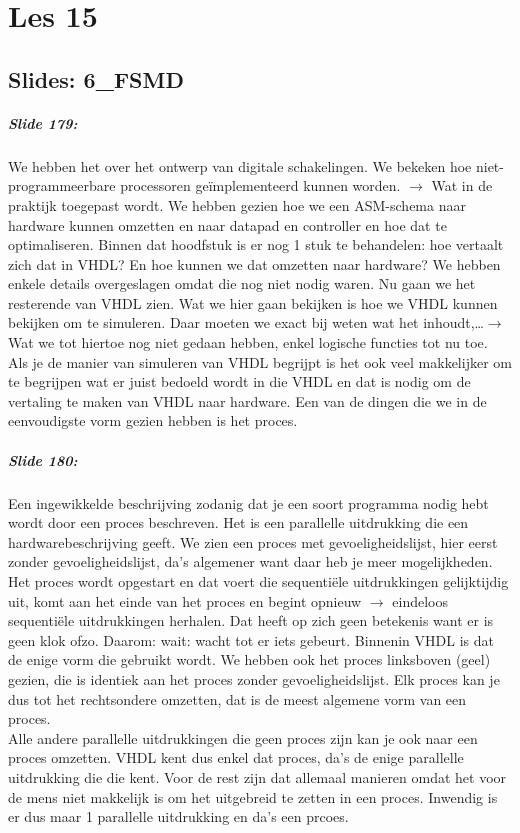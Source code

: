 \documentclass[10pt,a4paper]{book}
\begin{document}
\chapter{Les 15}

\section{Slides: 6\_FSMD}

\paragraph{Slide 179:} We hebben het over het ontwerp van digitale schakelingen. We bekeken hoe niet-programmeerbare processoren ge\"implementeerd kunnen worden. $\rightarrow$ Wat in de praktijk toegepast wordt. We hebben gezien hoe we een ASM-schema naar hardware kunnen omzetten en naar datapad en controller en hoe dat te optimaliseren. Binnen dat hoodfstuk is er nog 1 stuk te behandelen: hoe vertaalt zich dat in VHDL? En hoe kunnen we dat omzetten naar hardware? We hebben enkele details overgeslagen omdat die nog niet nodig waren. Nu gaan we het resterende van VHDL zien. Wat we hier gaan bekijken is hoe we VHDL kunnen bekijken om te simuleren. Daar moeten we exact bij weten wat het inhoudt,\ldots  $\rightarrow$ Wat we tot hiertoe nog niet gedaan hebben, enkel logische functies tot nu toe. Als je de manier van simuleren van VHDL begrijpt is het ook veel makkelijker om te begrijpen wat er juist bedoeld wordt in die VHDL en dat is nodig om de vertaling te maken van VHDL naar hardware. Een van de dingen die we in de eenvoudigste vorm gezien hebben is het proces.

\paragraph{Slide 180:} Een ingewikkelde beschrijving zodanig dat je een soort programma nodig hebt wordt door een proces beschreven. Het is een parallelle uitdrukking die een hardwarebeschrijving geeft. We zien een proces met gevoeligheidslijst, hier eerst zonder gevoeligheidslijst, da's algemener want daar heb je meer mogelijkheden.\\
Het proces wordt opgestart en dat voert die sequenti\"ele uitdrukkingen gelijktijdig uit, komt aan het einde van het proces en begint opnieuw $\rightarrow$ eindeloos sequenti\"ele uitdrukkingen herhalen. Dat heeft op zich geen betekenis want er is geen klok ofzo. Daarom: wait: wacht tot er iets gebeurt. Binnenin VHDL is dat de enige vorm die gebruikt wordt. We hebben ook het proces linksboven (geel) gezien, die is identiek aan het proces zonder gevoeligheidslijst. Elk proces kan je dus tot het rechtsondere omzetten, dat is de meest algemene vorm van een proces.\\
Alle andere parallelle uitdrukkingen die geen proces zijn kan je ook naar een proces omzetten. VHDL kent dus enkel dat proces, da's de enige parallelle uitdrukking die die kent. Voor de rest zijn dat allemaal manieren omdat het voor de mens niet makkelijk is om het uitgebreid te zetten in een proces. Inwendig is er dus maar 1 parallelle uitdrukking en da's een prcoes.
\end{document}
